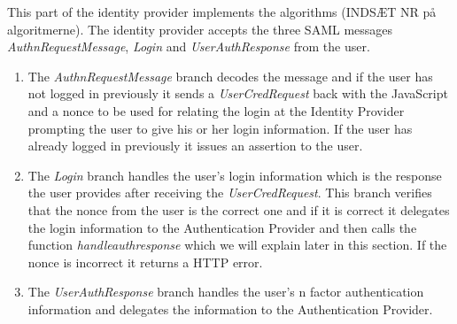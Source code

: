 \documentclass[twosided]{report}
\begin{document}
This part of the identity provider implements the algorithms (INDSÆT NR på algoritmerne). The identity provider accepts the three SAML messages \emph{AuthnRequestMessage}, \emph{Login} and \emph{UserAuthResponse} from the user.
\begin{enumerate}
\item The \emph{AuthnRequestMessage} branch decodes the message and if the user has not logged in previously it sends a \emph{UserCredRequest} back with the JavaScript and a nonce to be used for relating the login at the Identity Provider prompting the user to give his or her login information. If the user has already logged in previously it issues an assertion to the user.
\item The \emph{Login} branch handles the user's login information which is the response the user provides after receiving the \emph{UserCredRequest}. This branch verifies that the nonce from the user is the correct one and if it is correct it delegates the login information to the Authentication Provider and then calls the function \emph{handleauthresponse} which we will explain later in this section. If the nonce is incorrect it returns a HTTP error.
\item The \emph{UserAuthResponse} branch handles the user's n factor authentication information and delegates the information to the Authentication Provider.
\end{enumerate}
\end{document}
